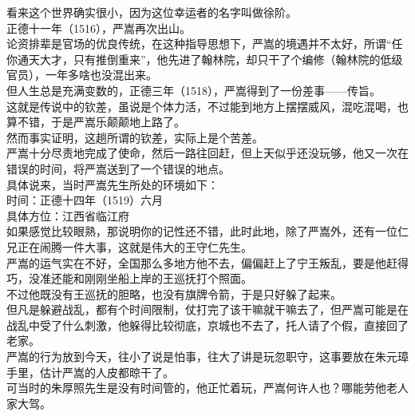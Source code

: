 \begin{multicols}{\theparacolNo}
看来这个世界确实很小，因为这位幸运者的名字叫做徐阶。\\

正德十一年（1516），严嵩再次出山。\\

论资排辈是官场的优良传统，在这种指导思想下，严嵩的境遇并不太好，所谓“任你通天大才，只有推倒重来”，他先进了翰林院，却只干了个编修（翰林院的低级官员），一年多啥也没混出来。\\

但人生总是充满变数的，正德三年（1518），严嵩得到了一份差事——传旨。\\

这就是传说中的钦差，虽说是个体力活，不过能到地方上摆摆威风，混吃混喝，也算不错，于是严嵩乐颠颠地上路了。\\

然而事实证明，这趟所谓的钦差，实际上是个苦差。\\

严嵩十分尽责地完成了使命，然后一路往回赶，但上天似乎还没玩够，他又一次在错误的时间，将严嵩送到了一个错误的地点。\\

具体说来，当时严嵩先生所处的环境如下：\\

时间：正德十四年（1519）六月\\

具体方位：江西省临江府\\

如果感觉比较眼熟，那说明你的记性还不错，此时此地，除了严嵩外，还有一位仁兄正在闹腾一件大事，这就是伟大的王守仁先生。\\

严嵩的运气实在不好，全国那么多地方他不去，偏偏赶上了宁王叛乱，要是他赶得巧，没准还能和刚刚坐船上岸的王巡抚打个照面。\\

不过他既没有王巡抚的胆略，也没有旗牌令箭，于是只好躲了起来。\\

但凡是躲避战乱，都有个时间限制，仗打完了该干嘛就干嘛去了，但严嵩可能是在战乱中受了什么刺激，他躲得比较彻底，京城也不去了，托人请了个假，直接回了老家。\\

严嵩的行为放到今天，往小了说是怕事，往大了讲是玩忽职守，这事要放在朱元璋手里，估计严嵩的人皮都晾干了。\\

可当时的朱厚照先生是没有时间管的，他正忙着玩，严嵩何许人也？哪能劳他老人家大驾。\\


\end{multicols}
